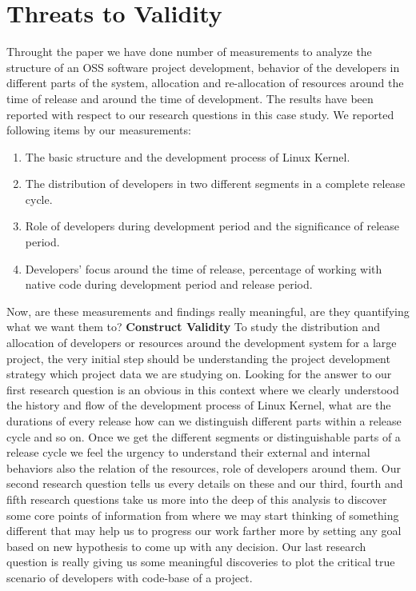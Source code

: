 \documentclass{acm_proc_article-sp}
\begin{document}
\section{Threats to Validity}
Throught the paper we have done number of measurements to analyze the structure of an OSS software project development, behavior of the developers in different parts of the system, allocation and re-allocation of resources around the time of release and around the time of development. The results have been reported with respect to our research questions in this case study. We reported following items by our measurements:
\renewcommand{\labelenumi}{\theenumi.}
\begin{enumerate}
\item{The basic structure and the development process of Linux Kernel.}
\item{The distribution of developers in two different segments in a complete release cycle.}
\item{Role of developers during development period and the significance of release period.}
\item{Developers' focus around the time of release, percentage of working with native code during development period and release period.}
\end{enumerate}
Now, are these measurements and findings really meaningful, are they quantifying what we want them to?\newline\newline
\textbf{Construct Validity} To study the distribution and allocation of developers or resources around the development system for a large project, the very initial step should be understanding the project development strategy which project data we are studying on. Looking for the answer to our first research question is an obvious in this context where we clearly understood the history and flow of the development process of Linux Kernel, what are the durations of every release how can we distinguish different parts within a release cycle and so on. Once we get the different segments or distinguishable parts of a release cycle we feel the urgency to understand their external and internal behaviors also the relation of the resources, role of developers around them. Our second research question tells us every details on these and our third, fourth and fifth research questions take us more into the deep of this analysis to discover some core points of information from where we may start thinking of something different that may help us to progress our work farther more by setting any goal based on new hypothesis to come up with any decision. Our last research question is really giving us some meaningful discoveries to plot the critical true scenario of developers with code-base of a project.\newline\newline
\end{document}
